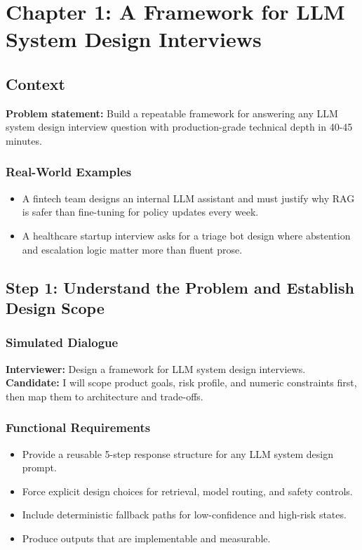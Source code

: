 \chapter{Chapter 1: A Framework for LLM System Design Interviews}

\section*{Context}
\textbf{Problem statement:} Build a repeatable framework for answering any LLM system design interview question with production-grade technical depth in 40-45 minutes.


\subsection*{Real-World Examples}
\begin{itemize}
  \item A fintech team designs an internal LLM assistant and must justify why RAG is safer than fine-tuning for policy updates every week.
  \item A healthcare startup interview asks for a triage bot design where abstention and escalation logic matter more than fluent prose.
\end{itemize}

\section*{Step 1: Understand the Problem and Establish Design Scope}
\subsection*{Simulated Dialogue}
\textbf{Interviewer:} Design a framework for LLM system design interviews.\\
\textbf{Candidate:} I will scope product goals, risk profile, and numeric constraints first, then map them to architecture and trade-offs.

\subsection*{Functional Requirements}
\begin{itemize}
  \item Provide a reusable 5-step response structure for any LLM system design prompt.
  \item Force explicit design choices for retrieval, model routing, and safety controls.
  \item Include deterministic fallback paths for low-confidence and high-risk states.
  \item Produce outputs that are implementable and measurable.
\end{itemize}

